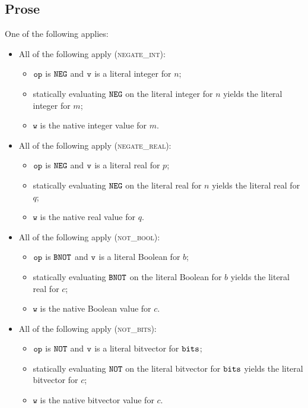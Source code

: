 \documentclass{book}
\newcommand\vw[0]{\texttt{w}}
\begin{document}
\subsection{Prose}
One of the following applies:
\begin{itemize}
  \item All of the following apply (\textsc{negate\_int}):
  \begin{itemize}
    \item $\texttt{op}$ is $\texttt{NEG}$ and $\texttt{v}$ is a literal integer for $n$;
    \item statically evaluating $\texttt{NEG}$ on the literal integer for $n$ yields the
          literal integer for $m$;
    \item $\vw$ is the native integer value for $m$.
  \end{itemize}

  \item All of the following apply (\textsc{negate\_real}):
  \begin{itemize}
    \item $\texttt{op}$ is $\texttt{NEG}$ and $\texttt{v}$ is a literal real for $p$;
    \item statically evaluating $\texttt{NEG}$ on the literal real for $n$ yields the
          literal real for $q$;
    \item $\vw$ is the native real value for $q$.
  \end{itemize}

  \item All of the following apply (\textsc{not\_bool}):
  \begin{itemize}
    \item $\texttt{op}$ is $\texttt{BNOT}$ and $\texttt{v}$ is a literal Boolean for $b$;
    \item statically evaluating $\texttt{BNOT}$ on the literal Boolean for $b$ yields the
          literal real for $c$;
    \item $\vw$ is the native Boolean value for $c$.
  \end{itemize}

  \item All of the following apply (\textsc{not\_bits}):
  \begin{itemize}
    \item $\texttt{op}$ is $\texttt{NOT}$ and $\texttt{v}$ is a literal bitvector for $\texttt{bits}$;
    \item statically evaluating $\texttt{NOT}$ on the literal bitvector for $\texttt{bits}$ yields the
          literal bitvector for $c$;
    \item $\vw$ is the native bitvector value for $c$.
  \end{itemize}
\end{itemize}
\end{document}
